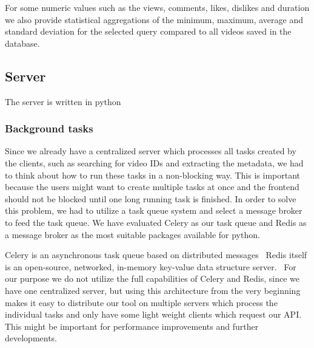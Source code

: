 For some numeric values such as the views, comments, likes, dislikes and duration we also provide statistical aggregations of the minimum,
maximum, average and standard deviation for the selected query compared to all videos saved in the database.


\subsection{Server}
The server is written in python

\subsubsection{Background tasks}
Since we already have a centralized server which processes all tasks created by the clients, such as searching for 
video IDs and extracting the metadata, we had to think about how to run these tasks in a non-blocking way.
This is important
because the users might want to create multiple tasks at once and the frontend should not be blocked until one long running task
is finished. In order to solve this problem, we had to utilize a task queue system and select a message broker to feed the task queue.
We have evaluated Celery as our task queue and Redis as a message broker as the most suitable packages available for python.

Celery is an asynchronous task queue based on distributed messages~\cite{architecture:celery}
Redis itself is an open-source, networked, in-memory key-value data structure server.~\cite{architecture:redis} For our
purpose we do not utilize the full capabilities of Celery and Redis, since we have one centralized server, but using
this architecture from the very beginning makes it easy to distribute our tool on multiple servers which process the individual tasks and only
have some light weight clients which request our API.
This might be important for performance improvements and further developments.

